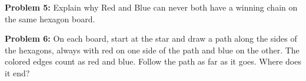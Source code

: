 \documentclass[12pt]{article}
\newcommand{\prob}[1]{\textbf{Problem #1:}}
\begin{document}
\vspace{6mm}

\prob{5} Explain why Red and Blue can never both have a winning chain on the same hexagon board.\par\vspace{11mm}\noindent{}\par

\clearpage
\prob{6} On each board, start at the star and draw a path along the sides of the hexagons, always with red on one side of the path and blue on the other. The colored edges count as red and blue. Follow the path as far as it goes. Where does it end?
\end{document}
